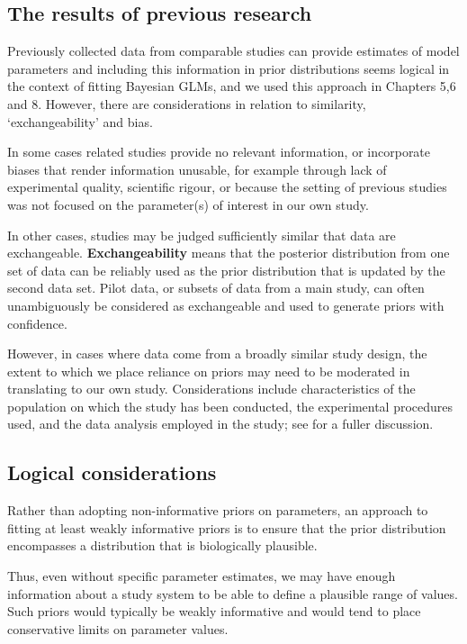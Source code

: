 \documentclass[
]{book}
\begin{document}
\hypertarget{the-results-of-previous-research}{%
\subsection{The results of previous research}\label{the-results-of-previous-research}}

Previously collected data from comparable studies can provide estimates of model parameters and including this information in prior distributions seems logical in the context of fitting Bayesian GLMs, and we used this approach in Chapters 5,6 and 8. However, there are considerations in relation to similarity, `exchangeability' and bias.

In some cases related studies provide no relevant information, or incorporate biases that render information unusable, for example through lack of experimental quality, scientific rigour, or because the setting of previous studies was not focused on the parameter(s) of interest in our own study.

In other cases, studies may be judged sufficiently similar that data are exchangeable. \textbf{Exchangeability} means that the posterior distribution from one set of data can be reliably used as the prior distribution that is updated by the second data set. Pilot data, or subsets of data from a main study, can often unambiguously be considered as exchangeable and used to generate priors with confidence.

However, in cases where data come from a broadly similar study design, the extent to which we place reliance on priors may need to be moderated in translating to our own study. Considerations include characteristics of the population on which the study has been conducted, the experimental procedures used, and the data analysis employed in the study; see \citet{Miocevic_2020} for a fuller discussion.

\hypertarget{logical-considerations}{%
\subsection{Logical considerations}\label{logical-considerations}}

Rather than adopting non-informative priors on parameters, an approach to fitting at least weakly informative priors is to ensure that the prior distribution encompasses a distribution that is biologically plausible.

Thus, even without specific parameter estimates, we may have enough information about a study system to be able to define a plausible range of values. Such priors would typically be weakly informative and would tend to place conservative limits on parameter values.
\end{document}

